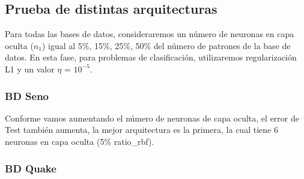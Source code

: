 \subsection{Prueba de distintas arquitecturas}
Para todas las bases de datos, consideraremos un número de neuronas en capa oculta ($n_1$) igual al 5\%, 15\%, 25\%, 50\% del número de patrones de la base de datos. En esta fase, para problemas de clasificación, utilizaremos regularización L1 y un valor $\eta$ = $10^{-5}$.


\subsubsection{BD Seno}

\begin{table}[H]
\centering
\vspace{1ex}
\small
{}
\caption{Base de datos seno}
\label{table:tabla seno}
\end{table}

Conforme vamos aumentando el número de neuronas de capa oculta, el error de Test también aumenta, la mejor arquitectura es la primera, la cual tiene 6 neuronas en capa oculta (5\% ratio\_rbf). 

\subsubsection{BD Quake}
\begin{table}[H]
\centering
\vspace{1ex}
\small
{}
\caption{Base de datos Quake}
\label{table:tabla quake}
\end{table}

